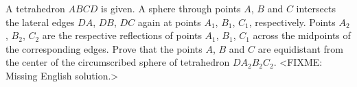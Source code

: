 \problem
A tetrahedron $ABCD$ is given.
A sphere through points $A$, $B$ and $C$ intersects the lateral edges
$DA$, $DB$, $DC$ again at points $A_1$, $B_1$, $C_1$, respectively.
Points $A_2$, $B_2$, $C_2$ are the respective reflections of points
$A_1$, $B_1$, $C_1$ across the midpoints of the corresponding edges.
Prove that the points $A$, $B$ and $C$ are equidistant from the center of the
circumscribed sphere of tetrahedron $DA_2B_2C_2$.
\solution
<FIXME: Missing English solution.>
\endproblem
